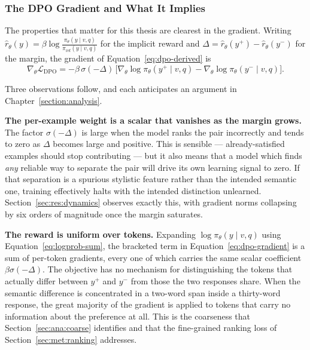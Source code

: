 \subsubsection{The DPO Gradient and What It Implies}

The properties that matter for this thesis are clearest in the gradient. Writing $\hat{r}_\theta(y) = \beta \log \frac{\pi_\theta(y \mid v,q)}{\pi_{\text{ref}}(y \mid v,q)}$ for the implicit reward and $\Delta = \hat{r}_\theta(y^+) - \hat{r}_\theta(y^-)$ for the margin, the gradient of Equation~\ref{eq:dpo-derived} is
\begin{equation}\label{eq:dpo-gradient}
\nabla_\theta \mathcal{L}_{\text{DPO}} = -\beta\,\sigma(-\Delta)\,\Big[\nabla_\theta \log \pi_\theta(y^+ \mid v,q) - \nabla_\theta \log \pi_\theta(y^- \mid v,q)\Big].
\end{equation}

Three observations follow, and each anticipates an argument in Chapter~\ref{section:analysis}.

\textbf{The per-example weight is a scalar that vanishes as the margin grows.} The factor $\sigma(-\Delta)$ is large when the model ranks the pair incorrectly and tends to zero as $\Delta$ becomes large and positive. This is sensible --- already-satisfied examples should stop contributing --- but it also means that a model which finds \emph{any} reliable way to separate the pair will drive its own learning signal to zero. If that separation is a spurious stylistic feature rather than the intended semantic one, training effectively halts with the intended distinction unlearned. Section~\ref{sec:res:dynamics} observes exactly this, with gradient norms collapsing by six orders of magnitude once the margin saturates.

\textbf{The reward is uniform over tokens.} Expanding $\log \pi_\theta(y \mid v,q)$ using Equation~\ref{eq:logprob-sum}, the bracketed term in Equation~\ref{eq:dpo-gradient} is a sum of per-token gradients, every one of which carries the same scalar coefficient $\beta\sigma(-\Delta)$. The objective has no mechanism for distinguishing the tokens that actually differ between $y^+$ and $y^-$ from those the two responses share. When the semantic difference is concentrated in a two-word span inside a thirty-word response, the great majority of the gradient is applied to tokens that carry no information about the preference at all. This is the coarseness that Section~\ref{sec:ana:coarse} identifies and that the fine-grained ranking loss of Section~\ref{sec:met:ranking} addresses.

